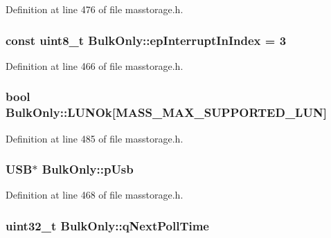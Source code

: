 \-Definition at line 476 of file masstorage.\-h.

\hypertarget{class_bulk_only_a03cd96b415990821bdce43b4004c85e4}{
\subsubsection[{ep\-Interrupt\-In\-Index}]{\setlength{\rightskip}{0pt plus 5cm}const uint8\-\_\-t {\bf \-Bulk\-Only\-::ep\-Interrupt\-In\-Index} = 3}}\label{class_bulk_only_a03cd96b415990821bdce43b4004c85e4}


\-Definition at line 466 of file masstorage.\-h.

\hypertarget{class_bulk_only_a9f9d9b0925a2cb6b2fb8b10e4d581d28}{
\subsubsection[{\-L\-U\-N\-Ok}]{\setlength{\rightskip}{0pt plus 5cm}bool {\bf \-Bulk\-Only\-::\-L\-U\-N\-Ok}\mbox{[}\-M\-A\-S\-S\-\_\-\-M\-A\-X\-\_\-\-S\-U\-P\-P\-O\-R\-T\-E\-D\-\_\-\-L\-U\-N\mbox{]}}}\label{class_bulk_only_a9f9d9b0925a2cb6b2fb8b10e4d581d28}


\-Definition at line 485 of file masstorage.\-h.

\hypertarget{class_bulk_only_a6b4ae384eea3aacd8bf916439621973a}{
\subsubsection[{p\-Usb}]{\setlength{\rightskip}{0pt plus 5cm}\-U\-S\-B$\ast$ {\bf \-Bulk\-Only\-::p\-Usb}}}\label{class_bulk_only_a6b4ae384eea3aacd8bf916439621973a}


\-Definition at line 468 of file masstorage.\-h.

\hypertarget{class_bulk_only_a2d422ee0745cd7c04afff905278c4233}{
\subsubsection[{q\-Next\-Poll\-Time}]{\setlength{\rightskip}{0pt plus 5cm}uint32\-\_\-t {\bf \-Bulk\-Only\-::q\-Next\-Poll\-Time}}}\label{class_bulk_only_a2d422ee0745cd7c04afff905278c4233}


